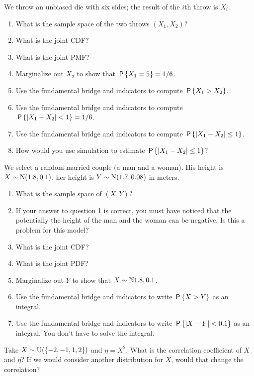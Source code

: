 \documentclass[assignments]{subfiles}
\begin{document}
\begin{exercise}
We throw an unbiased die with six sides; the result of the $i$th throw is $X_i$. 
\begin{enumerate}
\item What is the sample space of the two throws $(X_{1}, X_2)$?
\item What is the joint CDF?
\item What is the joint PMF?
\item  Marginalize out $X_2$ to show that $\P{X_1=5} = 1/6$.
\item Use the fundamental bridge and indicators to compute $\P{X_1>X_2}$.
\item Use the fundamental bridge and indicators to compute $\P{|X_1-X_2| < 1 } = 1/6$.
\item Use the fundamental bridge and indicators to compute $\P{|X_1-X_2|\leq 1 }$.
\item How would you use simulation to estimate  $\P{|X_1-X_2|\leq 1 }$?
\end{enumerate}
\end{exercise}

\begin{exercise}
We select a random married couple (a man and a woman). His height is $X\sim \Norm{1.8, 0.1}$, her height is $Y\sim \Norm{1.7, 0.08}$ in meters. 
\begin{enumerate}
\item What is the sample space of $(X, Y)$?
\item If your answer to question 1 is correct, you must have noticed that the potentially the height of the man and the woman can be negative. Is this a problem for this model? 
\item What is the joint CDF?
\item What is the joint PDF?
\item  Marginalize out $Y$ to show that $X\sim \N{1.8, 0.1}$.
\item Use the fundamental bridge and indicators to write  $\P{X>Y}$ as an integral.
\item Use the fundamental bridge and indicators to write  $\P{|X-Y| < 0.1 }$ as an integral. You don't have to solve the integral.
\end{enumerate}
\end{exercise}

\begin{exercise}
Take $X\sim\Unif{\{-2, -1, 1, 2\}}$ and $\eta = X^2$. What is the correlation coefficient of $X$ and $\eta$? 
If we would consider another distribution for $X$, would that change the correlation?
\end{exercise}
\end{document}
